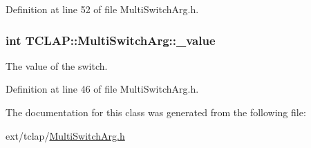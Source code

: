 Definition at line 52 of file Multi\+Switch\+Arg.\+h.

\hypertarget{class_t_c_l_a_p_1_1_multi_switch_arg_ab488d4bcdde96fc9edea87ee9b6f5839}{}
\subsubsection[{\+\_\+value}]{\setlength{\rightskip}{0pt plus 5cm}int T\+C\+L\+A\+P\+::\+Multi\+Switch\+Arg\+::\+\_\+value\hspace{0.3cm}{\ttfamily [protected]}}\label{class_t_c_l_a_p_1_1_multi_switch_arg_ab488d4bcdde96fc9edea87ee9b6f5839}
The value of the switch. 

Definition at line 46 of file Multi\+Switch\+Arg.\+h.



The documentation for this class was generated from the following file\+:\begin{DoxyCompactItemize}
\item 
ext/tclap/\hyperlink{_multi_switch_arg_8h}{Multi\+Switch\+Arg.\+h}\end{DoxyCompactItemize}

